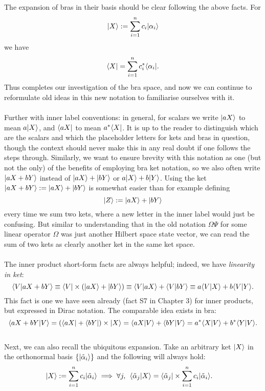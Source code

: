\\\\
The expansion of bras in their basis should be clear following the above facts. For 
$$
|X\rangle:=\sum_{i=1}^{n}c_{i}|\alpha_{i}\rangle
$$
we have 
$$
\langle X|=\sum_{i=1}^{n}c_{i}^{\ast}\langle\alpha_{i}|.
$$
Thus completes our investigation of the bra space, and now we can continue to reformulate old ideas in this new notation to familiarise ourselves with it.
\\\\
Further with inner label conventions: in general, for scalars we write
$|aX\rangle$ to mean $a|X\rangle$, and $\langle aX|$ to mean $a^{\ast}\langle X|$. It is up to the reader to distinguish which are the scalars and which the placeholder letters for kets and bras in question, though the context should never make this in any real doubt if one follows the steps through. Similarly, we want to ensure brevity with this notation as one (but not the only) of the benefits of employing bra ket notation, so we also often write $|aX+bY\rangle$ instead of $|aX\rangle+|bY\rangle$ or $a|X\rangle+b|Y\rangle$. Using the ket $|aX+bY\rangle:=|aX\rangle+|bY\rangle$ is somewhat easier than for example defining
$$
|Z\rangle:=|aX\rangle+|bY\rangle
$$ 
every time we sum two kets, where a new letter in the inner label would just be confusing. But similar to understanding that in the old notation $\Omega\Psi$ for some linear operator $\Omega$ was just another Hilbert space state vector, we can read the sum of two kets as clearly another ket in the same ket space.
\\\\
The inner product short-form facts are always helpful; indeed, we have \textit{linearity in ket}:
$$
\langle V|aX+bY\rangle\equiv\langle V|\times(|aX\rangle+|bY\rangle)\equiv\langle V|aX\rangle+\langle V|bY\rangle\equiv a\langle V|X\rangle+b\langle V|Y\rangle.
$$
This fact is one we have seen already (fact S7 in Chapter 3) for inner products, but expressed in Dirac notation. The comparable idea exists in bra:
$$
\langle aX+bY|V\rangle=(\langle aX|+\langle bY|)\times|X\rangle=\langle aX|V\rangle+\langle bY|V\rangle=a^{\ast}\langle X|V\rangle+b^{\ast}\langle Y|V\rangle.
$$
\\
Next, we can also recall the ubiquitous expansion. Take an arbitrary ket $|X\rangle$ in the orthonormal basis $\{|\tilde{\alpha}_{i}\rangle\}$ and the following will always hold: 
$$
\begin{aligned}
|X\rangle&:=\sum_{i=1}^{n}c_{i}|\tilde{\alpha}_{i}\rangle \implies \forall j, \:\: \langle\tilde{\alpha}_{j}|X\rangle=\langle\tilde{\alpha}_{j}|\times\sum_{i=1}^{n}c_{i}|\tilde{\alpha}_{i}\rangle.
&
\end{aligned}
$$
